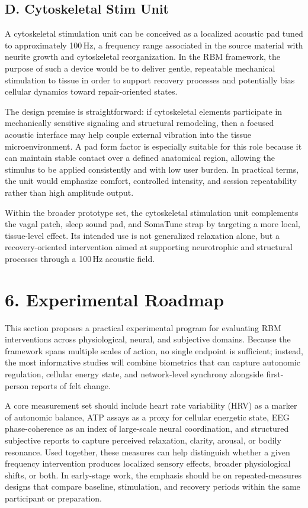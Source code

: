 \documentclass[11pt]{article}
\begin{document}
\subsection{D. Cytoskeletal Stim Unit}

A cytoskeletal stimulation unit can be conceived as a localized acoustic pad tuned to approximately 100\,Hz, a frequency range associated in the source material with neurite growth and cytoskeletal reorganization. In the RBM framework, the purpose of such a device would be to deliver gentle, repeatable mechanical stimulation to tissue in order to support recovery processes and potentially bias cellular dynamics toward repair-oriented states.

The design premise is straightforward: if cytoskeletal elements participate in mechanically sensitive signaling and structural remodeling, then a focused acoustic interface may help couple external vibration into the tissue microenvironment. A pad form factor is especially suitable for this role because it can maintain stable contact over a defined anatomical region, allowing the stimulus to be applied consistently and with low user burden. In practical terms, the unit would emphasize comfort, controlled intensity, and session repeatability rather than high amplitude output.

Within the broader prototype set, the cytoskeletal stimulation unit complements the vagal patch, sleep sound pad, and SomaTune strap by targeting a more local, tissue-level effect. Its intended use is not generalized relaxation alone, but a recovery-oriented intervention aimed at supporting neurotrophic and structural processes through a 100\,Hz acoustic field.


\section{6. Experimental Roadmap}

This section proposes a practical experimental program for evaluating RBM interventions across physiological, neural, and subjective domains. Because the framework spans multiple scales of action, no single endpoint is sufficient; instead, the most informative studies will combine biometrics that can capture autonomic regulation, cellular energy state, and network-level synchrony alongside first-person reports of felt change.

A core measurement set should include heart rate variability (HRV) as a marker of autonomic balance, ATP assays as a proxy for cellular energetic state, EEG phase-coherence as an index of large-scale neural coordination, and structured subjective reports to capture perceived relaxation, clarity, arousal, or bodily resonance. Used together, these measures can help distinguish whether a given frequency intervention produces localized sensory effects, broader physiological shifts, or both. In early-stage work, the emphasis should be on repeated-measures designs that compare baseline, stimulation, and recovery periods within the same participant or preparation.
\end{document}
